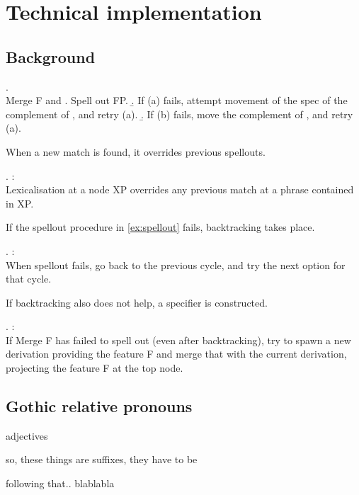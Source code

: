 
\chapter{Technical implementation}


\section{Background}



\ex. \\
Merge F and \label{ex:spellout}
 \a. Spell out FP.
 \b. If (a) fails, attempt movement of the spec of the complement of , and retry (a).
 \b. If (b) fails, move the complement of , and retry (a).

When a new match is found, it overrides previous spellouts.

\ex.  \citep{starke2018}:\\
Lexicalisation at a node XP overrides any previous match at a phrase contained in XP.

If the spellout procedure in \ref{ex:spellout} fails, backtracking takes place.

\ex.  \citep{starke2018}:\\
When spellout fails, go back to the previous cycle, and try the next option for that cycle.\label{ex:backtracking}

If backtracking also does not help, a specifier is constructed.

\ex.  \citep{starke2018}:\\
If Merge F has failed to spell out (even after backtracking), try to spawn a new derivation providing the feature F and merge that with the current derivation, projecting the feature F at the top node.\label{ex:specformation}

\phantom{hi}


\section{Gothic relative pronouns}

adjectives

so, these things are suffixes, they have to be

following that.. blablabla




